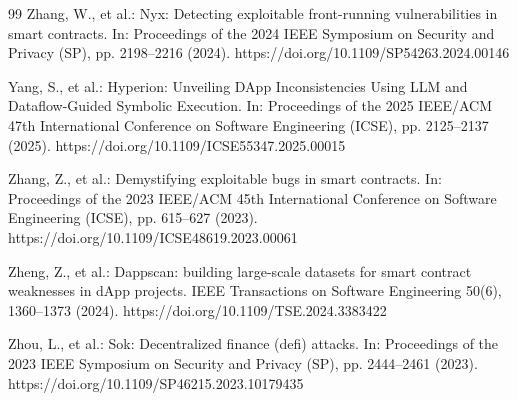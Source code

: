 \documentclass[pdflatex,sn-basic]{sn-jnl}%
\theoremstyle{thmstyleone}%
\theoremstyle{thmstyletwo}%
\theoremstyle{thmstylethree}%
\begin{document}
\begin{thebibliography}{99}
Zhang, W., et al.: Nyx: Detecting exploitable front-running vulnerabilities in smart contracts. In: Proceedings of the 2024 IEEE Symposium on Security and Privacy (SP), pp. 2198--2216 (2024). https://doi.org/10.1109/SP54263.2024.00146

Yang, S., et al.: Hyperion: Unveiling DApp Inconsistencies Using LLM and Dataflow-Guided Symbolic Execution. In: Proceedings of the 2025 IEEE/ACM 47th International Conference on Software Engineering (ICSE), pp. 2125--2137 (2025). https://doi.org/10.1109/ICSE55347.2025.00015

Zhang, Z., et al.: Demystifying exploitable bugs in smart contracts. In: Proceedings of the 2023 IEEE/ACM 45th International Conference on Software Engineering (ICSE), pp. 615--627 (2023). https://doi.org/10.1109/ICSE48619.2023.00061

Zheng, Z., et al.: Dappscan: building large-scale datasets for smart contract weaknesses in dApp projects. IEEE Transactions on Software Engineering 50(6), 1360--1373 (2024). https://doi.org/10.1109/TSE.2024.3383422

Zhou, L., et al.: Sok: Decentralized finance (defi) attacks. In: Proceedings of the 2023 IEEE Symposium on Security and Privacy (SP), pp. 2444--2461 (2023). https://doi.org/10.1109/SP46215.2023.10179435

\end{thebibliography}
\end{document}
